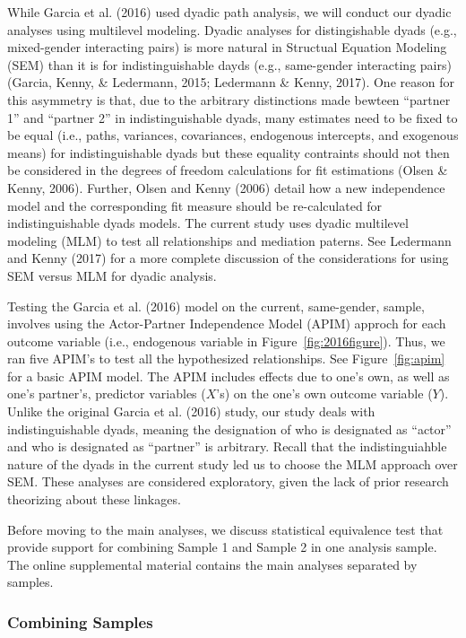\documentclass[man]{apa6}
\begin{document}
While Garcia et al. (2016) used dyadic path analysis, we will conduct
our dyadic analyses using multilevel modeling. Dyadic analyses for
distingishable dyads (e.g., mixed-gender interacting pairs) is more
natural in Structual Equation Modeling (SEM) than it is for
indistinguishable dayds (e.g., same-gender interacting pairs) (Garcia,
Kenny, \& Ledermann, 2015; Ledermann \& Kenny, 2017). One reason for
this asymmetry is that, due to the arbitrary distinctions made bewteen
\enquote{partner 1} and \enquote{partner 2} in indistinguishable dyads,
many estimates need to be fixed to be equal (i.e., paths, variances,
covariances, endogenous intercepts, and exogenous means) for
indistinguishable dyads but these equality contraints should not then be
considered in the degrees of freedom calculations for fit estimations
(Olsen \& Kenny, 2006). Further, Olsen and Kenny (2006) detail how a new
independence model and the corresponding fit measure should be
re-calculated for indistinguishable dyads models. The current study uses
dyadic multilevel modeling (MLM) to test all relationships and mediation
paterns. See Ledermann and Kenny (2017) for a more complete discussion
of the considerations for using SEM versus MLM for dyadic analysis.

Testing the Garcia et al. (2016) model on the current, same-gender,
sample, involves using the Actor-Partner Independence Model (APIM)
approch for each outcome variable (i.e., endogenous variable in
Figure~\ref{fig:2016figure}). Thus, we ran five APIM's to test all the
hypothesized relationships. See Figure~\ref{fig:apim} for a basic APIM
model. The APIM includes effects due to one's own, as well as one's
partner's, predictor variables (\(X\)'s) on the one's own outcome
variable (\(Y\)). Unlike the original Garcia et al. (2016) study, our
study deals with indistinguishable dyads, meaning the designation of who
is designated as \enquote{actor} and who is designated as
\enquote{partner} is arbitrary. Recall that the indistinguiahble nature
of the dyads in the current study led us to choose the MLM approach over
SEM. These analyses are considered exploratory, given the lack of prior
research theorizing about these linkages.

Before moving to the main analyses, we discuss statistical equivalence
test that provide support for combining Sample 1 and Sample 2 in one
analysis sample. The online supplemental material contains the main
analyses separated by samples.

\subsubsection{Combining Samples}\label{combining-samples-1}
\end{document}
